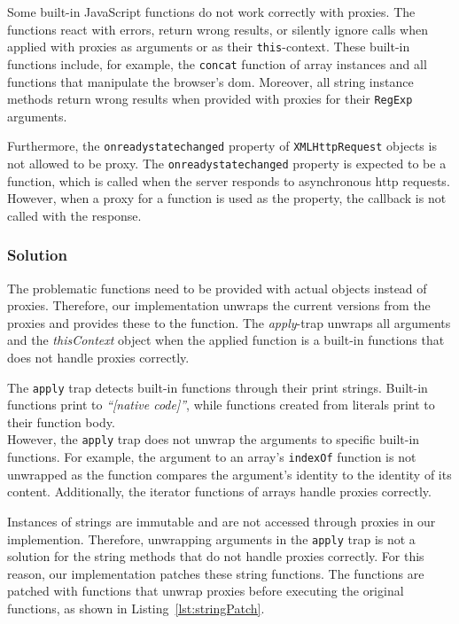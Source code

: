 Some built-in JavaScript functions do not work correctly with proxies.
The functions react with errors, return wrong results, or silently ignore calls when applied with proxies as arguments or as their \lstinline{this}-context.
These built-in functions include, for example, the \lstinline{concat} function of array instances and all functions that manipulate the browser's \ac{dom}.
Moreover, all string instance methods return wrong results when provided with proxies for their \lstinline{RegExp} arguments.

Furthermore, the \lstinline{onreadystatechanged} property of \lstinline{XMLHttpRequest} objects is not allowed to be proxy.
The \lstinline{onreadystatechanged} property is expected to be a function, which is called when the server responds to asynchronous \ac{http} requests. 
However, when a proxy for a function is used as the property, the callback is not called with the response.


\subsubsection{Solution}

The problematic functions need to be provided with actual objects instead of proxies.
Therefore, our implementation unwraps the current versions from the proxies and provides these to the function.
The \emph{apply}-trap unwraps all arguments and the \emph{thisContext} object when the applied function is a built-in functions that does not handle proxies correctly.

The \lstinline{apply} trap detects built-in functions through their print strings.
Built-in functions print to \emph{``[native code]''}, while functions created from literals print to their function body.\\
However, the \lstinline{apply} trap does not unwrap the arguments to specific built-in functions.
For example, the argument to an array's \lstinline{indexOf} function is not unwrapped as the function compares the argument's identity to the identity of its content.
Additionally, the iterator functions of arrays handle proxies correctly.

Instances of strings are immutable and are not accessed through proxies in our implemention.
Therefore, unwrapping arguments in the \lstinline{apply} trap is not a solution for the string methods that do not handle proxies correctly.
For this reason, our implementation patches these string functions.
The functions are patched with functions that unwrap proxies before executing the original functions, as shown in Listing~\ref{lst:stringPatch}.

